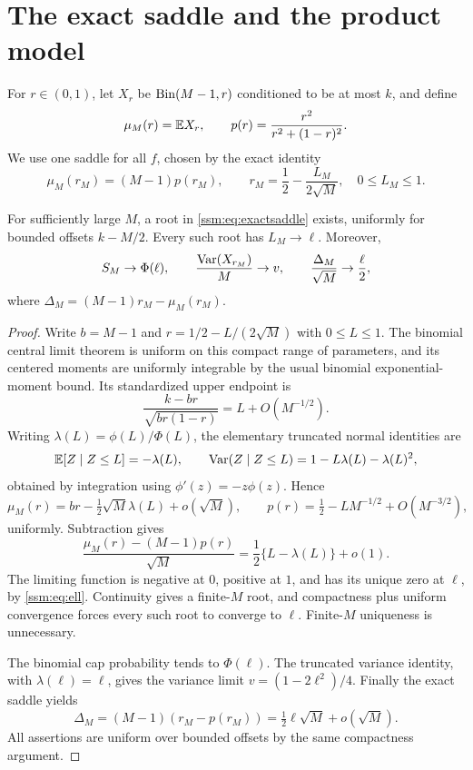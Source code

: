 \section{The exact saddle and the product model}\label{ssm:sec:saddle}
For $r\in(0,1)$, let $X_r$ be $\operatorname{Bin}(M-1,r)$ conditioned to be at most $k$, and define
\[
 \mu_M(r)=\mathbb E X_r,\qquad
 p(r)=\frac{r^2}{r^2+(1-r)^2}.
\]
We use one saddle for all $f$, chosen by the exact identity
\begin{equation}\label{ssm:eq:exactsaddle}
 \mu_M(r_M)=(M-1)p(r_M),\qquad
 r_M=\frac12-\frac{L_M}{2\sqrt M},\quad 0\le L_M\le1.
\end{equation}

\begin{lemma}\label{ssm:lem:saddle}
For sufficiently large $M$, a root in \eqref{ssm:eq:exactsaddle} exists, uniformly for bounded offsets $k-M/2$. Every such root has $L_M\to\ell$. Moreover,
\begin{equation}\label{ssm:eq:saddlelimits}
 S_M\to\Phi(\ell),\qquad
 \frac{\operatorname{Var}(X_{r_M})}{M}\to v,\qquad
 \frac{\Delta_M}{\sqrt M}\to\frac\ell2,
\end{equation}
where $\Delta_M=(M-1)r_M-\mu_M(r_M)$.
\end{lemma}
\begin{proof}
Write $b=M-1$ and $r=1/2-L/(2\sqrt M)$ with $0\le L\le1$. The binomial central limit theorem is uniform on this compact range of parameters, and its centered moments are uniformly integrable by the usual binomial exponential-moment bound. Its standardized upper endpoint is
\[
 \frac{k-br}{\sqrt{br(1-r)}}=L+O(M^{-1/2}).
\]
Writing $\lambda(L)=\phi(L)/\Phi(L)$, the elementary truncated normal identities are
\[
 \mathbb E[Z\mid Z\le L]=-\lambda(L),\qquad
 \operatorname{Var}(Z\mid Z\le L)=1-L\lambda(L)-\lambda(L)^2,
\]
obtained by integration using $\phi'(z)=-z\phi(z)$. Hence
\[
 \mu_M(r)=br-\tfrac12\sqrt M\lambda(L)+o(\sqrt M),
 \qquad p(r)=\tfrac12-LM^{-1/2}+O(M^{-3/2}),
\]
uniformly. Subtraction gives
\begin{equation}\label{ssm:eq:rootlimit}
 \frac{\mu_M(r)-(M-1)p(r)}{\sqrt M}
 =\frac12\{L-\lambda(L)\}+o(1).
\end{equation}
The limiting function is negative at $0$, positive at $1$, and has its unique zero at $\ell$, by \eqref{ssm:eq:ell}. Continuity gives a finite-$M$ root, and compactness plus uniform convergence forces every such root to converge to $\ell$. Finite-$M$ uniqueness is unnecessary.

The binomial cap probability tends to $\Phi(\ell)$. The truncated variance identity, with $\lambda(\ell)=\ell$, gives the variance limit $v=(1-2\ell^2)/4$. Finally the exact saddle yields
\[
 \Delta_M=(M-1)(r_M-p(r_M))=\tfrac12\ell\sqrt M+o(\sqrt M).
\]
All assertions are uniform over bounded offsets by the same compactness argument.
\end{proof}


